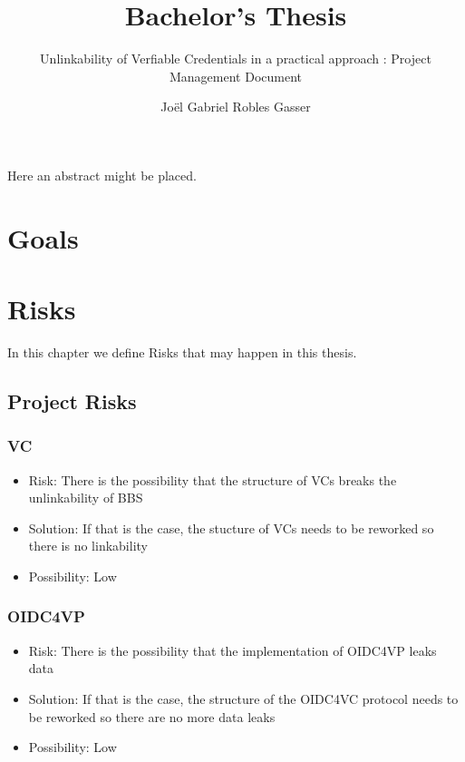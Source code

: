 \documentclass[
	a4paper               %
	,bibliography=totoc   %
	,listof=totoc         %
	,monolingual
	twoside=false,
]{bfhthesis}              %
\begin{document}
\frontmatter

\title{Bachelor's Thesis}
\subtitle{Unlinkability of Verfiable Credentials in a practical approach
: Project Management Document}
\author{Joël Gabriel Robles Gasser}

\maketitle

Here an abstract might be placed.


\tableofcontents

\mainmatter

\chapter{Goals}


\chapter{Risks}
In this chapter we define Risks that may happen in this thesis.

\section{Project Risks}

\subsection{VC}
\begin{itemize}
	\item Risk: There is the possibility that the structure of VCs breaks the unlinkability of BBS
	\item Solution: If that is the case, the stucture of VCs needs to be reworked so there is no linkability
	\item Possibility: Low
\end{itemize}

\subsection{OIDC4VP}
\begin{itemize}
	\item Risk: There is the possibility that the implementation of OIDC4VP leaks data
	\item Solution: If that is the case, the structure of the OIDC4VC protocol needs to be reworked so there are no more data leaks
	\item Possibility: Low
\end{itemize}
\end{document}
